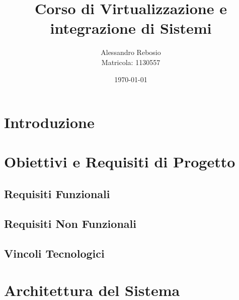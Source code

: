 \documentclass[12pt,a4paper]{report}
\begin{document}
\title{Corso di Virtualizzazione e integrazione di Sistemi}
\author{
  Alessandro Rebosio \\
  Matricola: 1130557
}
\date{\today}

\maketitle


\chapter*{Introduzione}
\label{chap:introduzione}

\tableofcontents

\cleardoublepage
{}
\setcounter{page}{1}

\chapter{Obiettivi e Requisiti di Progetto}
\label{cap:obiettivi}

\section{Requisiti Funzionali}

\section{Requisiti Non Funzionali}

\section{Vincoli Tecnologici}

\chapter{Architettura del Sistema}
\label{cap:architettura}
\end{document}
